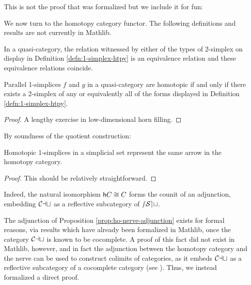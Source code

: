 This is not the proof that was formalized but we include it for fun:



 We now turn to the homotopy category functor. The following definitions and results are not currently in Mathlib.


   In a quasi-category, the relation witnessed by either of the types of 2-simplex on display in Definition \ref{defn:1-simplex-htpy} is an equivalence relation and these equivalence relations coincide.

   \begin{lemma}\label{lem:qcat-1-simplex-htpy}
    Parallel 1-sim\-plices $f$ and $g$ in a quasi-category are homotopic if and only if there exists a 2-simplex of any or equivalently all of the forms displayed in Definition \ref{defn:1-simplex-htpy}.
   \end{lemma}
 \begin{proof}
   A lengthy exercise in low-dimensional horn filling.
   \end{proof}





By soundness of the quotient construction:

\begin{lem}\label{lem:1-simplex-htpy-in-homotopy-cat}
  Homotopic 1-simplices in a simplicial set represent the same arrow in the homotopy category.
\end{lem}
\begin{proof}
This should be relatively straightforward.
\end{proof}




   Indeed, the natural isomorphism ${\mathord{\mathsf{h}}}{C} \cong C$ forms the counit of an adjunction, embedding ${\mathord{\mathcal{Cat}}}$ as a reflective subcategory of ${\mathord{\mathcal{sSet}}}$.


   The adjunction of Proposition \ref{prop:ho-nerve-adjunction} exists for formal reasons, via results which have already been formalized in Mathlib, %
   once the category ${\mathord{\mathcal{Cat}}}$ is known to be cocomplete. A proof of this fact did not exist in Mathlib, however, and in fact the adjunction between the homotopy category and the nerve can be used to construct colimits of categories, as it embeds ${\mathord{\mathcal{Cat}}}$ as a reflective subcategory of a cocomplete category (see \cite[4.5.16]{Riehl:2016cc}). Thus, we instead formalized a direct proof.



